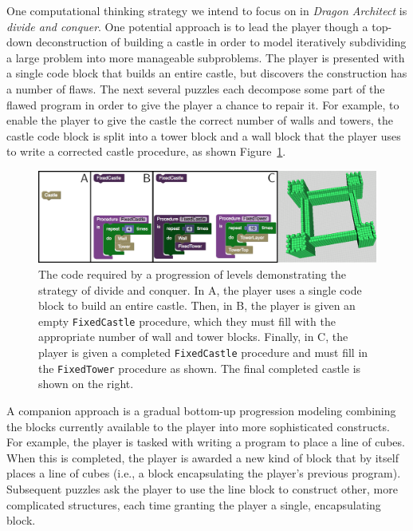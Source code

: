 \documentclass[conference]{IEEEtran}
\begin{document}
One computational thinking strategy we intend to focus on in \emph{Dragon Architect} is \emph{divide and conquer}.
One potential approach is to lead the player though a top-down deconstruction of building a castle in order to model iteratively subdividing a large problem into more manageable subproblems.
The player is presented with a single code block that builds an entire castle, but discovers the construction has a number of flaws. 
The next several puzzles each decompose some part of the flawed program in order to give the player a chance to repair it. 
For example, to enable the player to give the castle the correct number of walls and towers, the castle code block is split into a tower block and a wall block that the player uses to write a corrected castle procedure, as shown Figure~\ref{fig:decomp}. 

\begin{figure}[th!]
  \centering
  \includegraphics[width=\textwidth]{images/decomp-code}
  \caption{The code required by a progression of levels demonstrating the strategy of divide and conquer. In A, the player uses a single code block to build an entire castle. Then, in B, the player is given an empty \texttt{FixedCastle} procedure, which they must fill with the appropriate number of wall and tower blocks. Finally, in C, the player is given a completed \texttt{FixedCastle} procedure and must fill in the \texttt{FixedTower} procedure as shown. The final completed castle is shown on the right.}
  \label{fig:decomp}
\end{figure}

A companion approach is a gradual bottom-up progression modeling combining the blocks currently available to the player into more sophisticated constructs. 
For example, the player is tasked with writing a program to place a line of cubes. 
When this is completed, the player is awarded a new kind of block that by itself places a line of cubes (i.e., a block encapsulating the player's previous program). 
Subsequent puzzles ask the player to use the line block to construct other, more complicated structures, each time granting the player a single, encapsulating block.  
\end{document}
